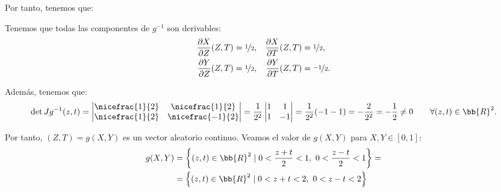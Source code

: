 \documentclass[12pt]{article}
\begin{document}
\begin{ejercicio}
\begin{enumerate}
            Por tanto, tenemos que:
    
            Tenemos que todas las componentes de $g^{-1}$ son derivables:
            \begin{align*}
                \dfrac{\partial X}{\partial Z}(Z,T)&=\nicefrac{1}{2}, & \dfrac{\partial X}{\partial T}(Z,T)&=\nicefrac{1}{2},\\
                \dfrac{\partial Y}{\partial Z}(Z,T)&=\nicefrac{1}{2}, & \dfrac{\partial Y}{\partial T}(Z,T)&=\nicefrac{-1}{2}.
            \end{align*}
    
            Además, tenemos que:
            \begin{equation*}
                \det Jg^{-1}(z,t)=\begin{vmatrix}
                    \nicefrac{1}{2} & \nicefrac{1}{2} \\
                    \nicefrac{1}{2} & \nicefrac{-1}{2}
                \end{vmatrix}=\frac{1}{2^2}\begin{vmatrix}
                    1 & 1 \\
                    1 & -1
                \end{vmatrix}=\frac{1}{2^2}(-1-1)=-\frac{2}{2^2}=-\frac{1}{2}\neq 0 \qquad \forall (z,t)\in\bb{R}^2.
            \end{equation*}
    
            Por tanto, $(Z,T)=g(X,Y)$ es un vector aleatorio continuo. Veamos el valor de $g(X,Y)$ para $X,Y\in [0,1]$:
            \begin{align*}
                g(X,Y)&=\left\{(z,t)\in \bb{R}^2\mid 0<\dfrac{z+t}{2}<1,~0<\dfrac{z-t}{2}<1\right\}
                =\\&= \left\{(z,t)\in \bb{R}^2\mid 0<z+t<2,~0<z-t<2\right\}
            \end{align*}
            

\end{enumerate}
\end{ejercicio}
\end{document}
